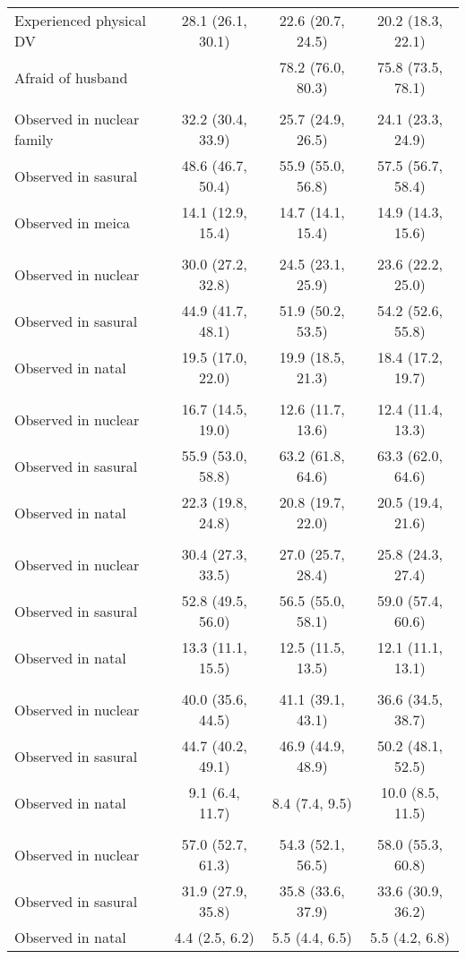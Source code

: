 \begin{tabular}{lccc}
Experienced physical DV&28.1 (26.1, 30.1)&22.6 (20.7, 24.5)&20.2 (18.3, 22.1)\\
Afraid of husband&&78.2 (76.0, 80.3)&75.8 (73.5, 78.1)\\
\textbf{Household structure (a&&&\\
Observed in nuclear family&32.2 (30.4, 33.9)&25.7 (24.9, 26.5)&24.1 (23.3, 24.9)\\
Observed in sasural&48.6 (46.7, 50.4)&55.9 (55.0, 56.8)&57.5 (56.7, 58.4)\\
Observed in meica&14.1 (12.9, 15.4)&14.7 (14.1, 15.4)&14.9 (14.3, 15.6)\\
\textbf{Household structure (8&&&\\
Observed in nuclear&30.0 (27.2, 32.8)&24.5 (23.1, 25.9)&23.6 (22.2, 25.0)\\
Observed in sasural&44.9 (41.7, 48.1)&51.9 (50.2, 53.5)&54.2 (52.6, 55.8)\\
Observed in natal&19.5 (17.0, 22.0)&19.9 (18.5, 21.3)&18.4 (17.2, 19.7)\\
\textbf{Household structure (p&&&\\
Observed in nuclear&16.7 (14.5, 19.0)&12.6 (11.7, 13.6)&12.4 (11.4, 13.3)\\
Observed in sasural&55.9 (53.0, 58.8)&63.2 (61.8, 64.6)&63.3 (62.0, 64.6)\\
Observed in natal&22.3 (19.8, 24.8)&20.8 (19.7, 22.0)&20.5 (19.4, 21.6)\\
\textbf{Household structure (p&&&\\
Observed in nuclear&30.4 (27.3, 33.5)&27.0 (25.7, 28.4)&25.8 (24.3, 27.4)\\
Observed in sasural&52.8 (49.5, 56.0)&56.5 (55.0, 58.1)&59.0 (57.4, 60.6)\\
Observed in natal&13.3 (11.1, 15.5)&12.5 (11.5, 13.5)&12.1 (11.1, 13.1)\\
\textbf{Household structure (8&&&\\
Observed in nuclear&40.0 (35.6, 44.5)&41.1 (39.1, 43.1)&36.6 (34.5, 38.7)\\
Observed in sasural&44.7 (40.2, 49.1)&46.9 (44.9, 48.9)&50.2 (48.1, 52.5)\\
Observed in natal&9.1 (6.4, 11.7)&8.4 (7.4, 9.5)&10.0 (8.5, 11.5)\\
\textbf{Household structure (p&&&\\
Observed in nuclear&57.0 (52.7, 61.3)&54.3 (52.1, 56.5)&58.0 (55.3, 60.8)\\
Observed in sasural&31.9 (27.9, 35.8)&35.8 (33.6, 37.9)&33.6 (30.9, 36.2)\\
Observed in natal&4.4 (2.5, 6.2)&5.5 (4.4, 6.5)&5.5 (4.2, 6.8)\\
\bottomrule
\end{tabular}

